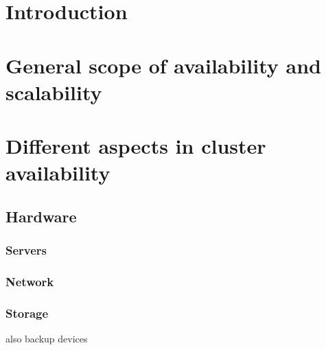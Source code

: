 \documentclass[12pt]{report}
\begin{document}
\newcommand{\treeroot}[1]{%
\node[above] at (0,0) {#1};%
\setcounter{treeline}{0}
}

\newcommand{\treeentry}[2]{%
\draw[->] (#2-1,-\value{treeline}/2) -- (#2-1,-\value{treeline}/2-0.5) -- (#2+0.5,-\value{treeline}/2-0.5) node[right] {#1};
\stepcounter{treeline}
}

\newcommand{\altentry}[2]{%
\draw[->] (#2-1,-\value{treeline}/2) -- (#2-1,-\value{treeline}/2-0.5) -- (#2+0.5,-\value{treeline}/2-0.5) node[right] {#1};
\foreach \x in {1,...,#2}
{   \draw (\x-1,-\value{treeline}/2) -- (\x-1,-\value{treeline}/2-0.5);
}
\stepcounter{treeline}
}


\tableofcontents %

\newpage %

\chapter{Introduction} %

\chapter{General scope of availability and scalability}

\chapter{Different aspects in cluster availability}
\label{chap:aspects}
\section{Hardware}
\subsection{Servers}
\subsection{Network}
\subsection{Storage}
also backup devices
\end{document}
